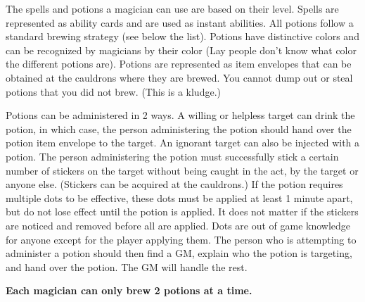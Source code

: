 \documentclass[green]{NeptuneBall}
\begin{document}
\name{\gPotions{}}

The spells and potions a magician can use are based on their level. Spells are represented as ability cards and are used as instant abilities. All potions follow a standard brewing strategy (see below the list). Potions have distinctive colors and can be recognized by magicians by their color (Lay people don't know what color the different potions are). Potions are represented as item envelopes that can be obtained at the cauldrons where they are brewed. You cannot dump out or steal potions that you did not brew. (This is a kludge.)

Potions can be administered in 2 ways. A willing or helpless target can drink the potion, in which case, the person administering the potion should hand over the potion item envelope to the target. An ignorant target can also be injected with a potion. The person administering the potion must successfully stick a certain number of stickers on the target without being caught in the act, by the target or anyone else. (Stickers can be acquired at the cauldrons.) If the potion requires multiple dots to be effective, these dots must be applied at least 1 minute apart, but do not lose effect until the potion is applied. It does not matter if the stickers are noticed and removed before all are applied. Dots are out of game knowledge for anyone except for the player applying them. The person who is attempting to administer a potion should then find a GM, explain who the potion is targeting, and hand over the potion. The GM will handle the rest.

{\bf Each magician can only brew 2 potions at a time.} %
\end{document}
